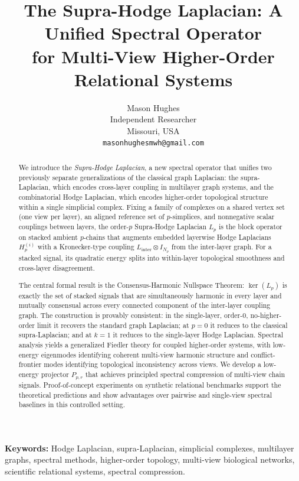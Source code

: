 \documentclass[11pt]{article}
\title{The Supra-Hodge Laplacian: A Unified Spectral Operator\\
       for Multi-View Higher-Order Relational Systems}
\author{Mason Hughes\\[4pt]
        Independent Researcher\\
        Missouri, USA\\
        \texttt{masonhughesmwh@gmail.com}}
\date{}
\theoremstyle{definition}
\theoremstyle{remark}
\begin{document}
\maketitle

\begin{abstract}
We introduce the \emph{Supra-Hodge Laplacian}, a new spectral operator that unifies two previously separate generalizations of the classical graph Laplacian: the supra-Laplacian, which encodes cross-layer coupling in multilayer graph systems, and the combinatorial Hodge Laplacian, which encodes higher-order topological structure within a single simplicial complex. Fixing a family of complexes on a shared vertex set (one view per layer), an aligned reference set of $p$-simplices, and nonnegative scalar couplings between layers, the order-$p$ Supra-Hodge Laplacian $L_p$ is the block operator on stacked ambient $p$-chains that augments embedded layerwise Hodge Laplacians $H_p^{(i)}$ with a Kronecker-type coupling $L_{\mathrm{inter}} \otimes I_{N_p}$ from the inter-layer graph. For a stacked signal, its quadratic energy splits into within-layer topological smoothness and cross-layer disagreement.

The central formal result is the Consensus-Harmonic Nullspace Theorem: $\ker(L_p)$ is exactly the set of stacked signals that are simultaneously harmonic in every layer and mutually consensual across every connected component of the inter-layer coupling graph. The construction is provably consistent: in the single-layer, order-$0$, no-higher-order limit it recovers the standard graph Laplacian; at $p=0$ it reduces to the classical supra-Laplacian; and at $k=1$ it reduces to the single-layer Hodge Laplacian. Spectral analysis yields a generalized Fiedler theory for coupled higher-order systems, with low-energy eigenmodes identifying coherent multi-view harmonic structure and conflict-frontier modes identifying topological inconsistency across views. We develop a low-energy projector $P_{p,r}$ that achieves principled spectral compression of multi-view chain signals. Proof-of-concept experiments on synthetic relational benchmarks support the theoretical predictions and show advantages over pairwise and single-view spectral baselines in this controlled setting.
\end{abstract}

\noindent\textbf{Keywords:} Hodge Laplacian, supra-Laplacian, simplicial complexes, multilayer graphs, spectral methods, higher-order topology, multi-view biological networks, scientific relational systems, spectral compression.
\end{document}
